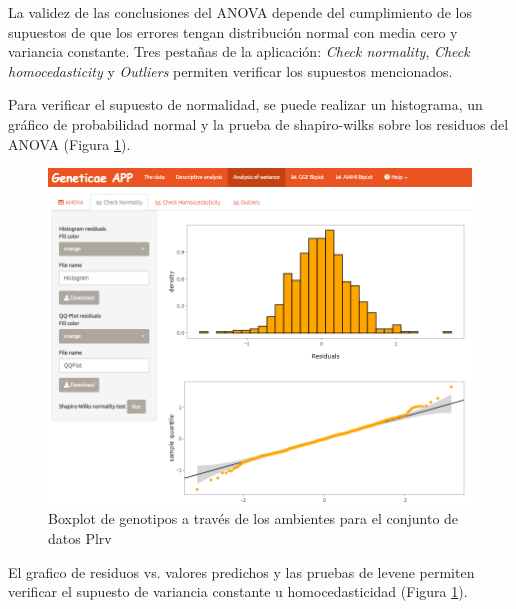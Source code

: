 La validez de las conclusiones del ANOVA depende del cumplimiento de los supuestos de que los errores tengan distribución normal con media cero y variancia constante. Tres pestañas de la aplicación: \emph{Check normality}, \emph{Check homocedasticity} y \emph{Outliers} permiten verificar los supuestos mencionados.

Para verificar el supuesto de normalidad, se puede realizar un histograma, un gráfico de probabilidad normal y la prueba de shapiro-wilks sobre los residuos del ANOVA (Figura \ref{fig:fig49}).

\begin{figure}[H]
	\begin{center}
		\includegraphics[width=17cm]{./Graficos/Normalidad.png}
	\end{center}
	\caption{Boxplot de genotipos a través de los ambientes para el conjunto de datos Plrv}
	\label{fig:fig49}
\end{figure}

El grafico de residuos vs. valores predichos y las pruebas de levene permiten verificar el supuesto de variancia constante u homocedasticidad (Figura \ref{fig:fig49}).

